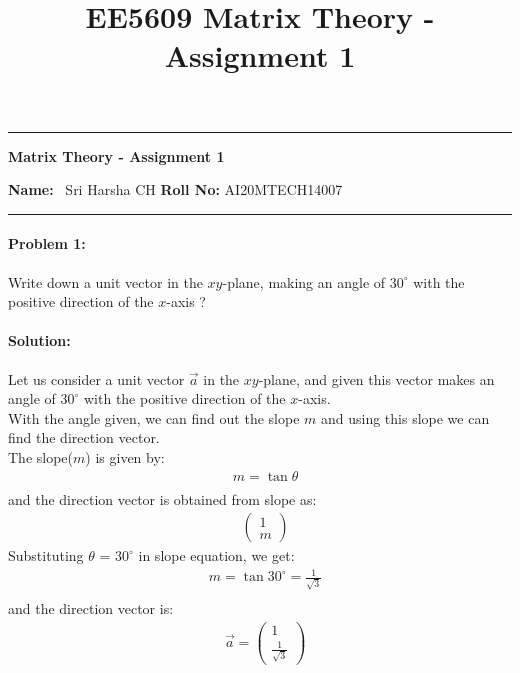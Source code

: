 \documentclass[12pt]{scrartcl}
\title{EE5609 Matrix Theory - Assignment 1}
\begin{document}
\begin{center}
	\hrule
	\vspace{.4cm}
	{\textbf { \large  Matrix Theory - Assignment 1}}
\end{center}
{ \textbf{Name:}} \ Sri Harsha CH \hspace{\fill} \textbf{Roll No:} AI20MTECH14007 \\
	\hrule

\paragraph*{Problem 1:} %
 Write down a unit vector in the $xy$\nobreakdash-plane, making an angle of $30^{\circ}$ with the positive direction of the $x$-axis ?


\paragraph*{Solution: } %
 Let us consider a unit vector $\vec{a}$ in the $xy$\nobreakdash-plane, and given this vector makes an angle of $30^{\circ}$ with the positive direction of the $x$-axis.\\
 With the angle given, we can find out the slope $m$ and using this slope we can find the direction vector.\\
 The slope($m$) is given by:\\
 \begin{align*}
& m = \tan{\theta}\\ 
\end{align*}
 and the direction vector is obtained from slope as:\\
 \begin{align*}
& \begin{pmatrix} 1 \\ m \end{pmatrix}
\end{align*}
Substituting $\theta$ = $30^{\circ}$ in slope equation, we get:
 \begin{align*}
& m = \tan{30^{\circ}} = \frac{1}{\sqrt{3}}\\ 
\end{align*}
and the direction vector is:
 \begin{align*}
& \vec{a}  = \begin{pmatrix} 1 \\ \frac{1}{\sqrt{3}} \end{pmatrix}
\end{align*}
\end{document}

